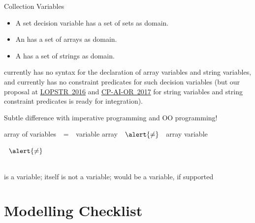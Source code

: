 \documentclass{cons-beamer}
\begin{document}
\begin{flashcardminizinc}
\begin{frame}{Collection Variables}
  \begin{definition}
    \begin{itemize}
    \item A set decision variable has a set of sets as domain.
    \item An  has a set of arrays as
      domain.
    \item A  has a set of strings as
      domain.
    \end{itemize}
  \end{definition}\vfill
  \MiniZinc currently has no syntax for the declaration of array
  variables and string variables, and \MiniZinc currently has no
  constraint predicates for such decision variables (but our proposal
  at \href{https://doi.org/10.1007/978-3-319-63139-4_4}{LOPSTR~2016}
  and
  \href{https://doi.org/10.1007/978-3-319-59776-8_5}{CP-AI-OR~2017}
  for string variables and string constraint predicates is ready for
  integration). \vfill
  \begin{block}{Subtle difference with imperative programming
      and OO programming!}
    \begin{center}
      array of variables $~~=~~$ variable array
      $~~\alert{\neq} ~~$ array variable \\
      \begin{footnotesize}
         $~~\alert{\neq}~~$
      \end{footnotesize} \\
       \alert{is} a variable;  itself
      \alert{is not} a variable;  \alert{would be} a
      variable, if supported
    \end{center}
  \end{block}
\end{frame}

\section{Modelling Checklist}


\end{flashcardminizinc}
\end{document}

